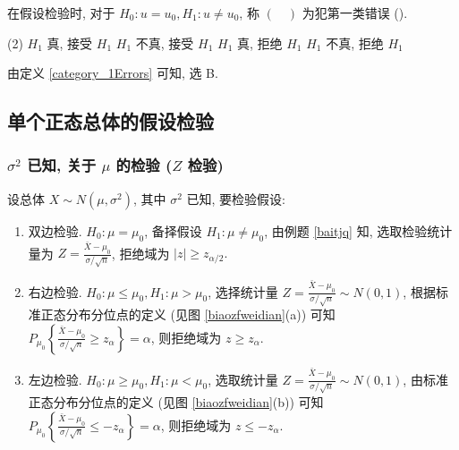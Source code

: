 \begin{example}
    在假设检验时, 对于 $H_0:u=u_0,H_1:u\neq u_0$, 称 $(\quad)$ 为犯第一类错误 (\quad).
    \begin{tasks}(2)
        \task $H_1$ 真, 接受 $H_1$
        \task $H_1$ 不真, 接受 $H_1$
        \task $H_1$ 真, 拒绝 $H_1$
        \task $H_1$ 不真, 拒绝 $H_1$
    \end{tasks}
\end{example}
\begin{solution}
    由定义 \ref{category_1Errors} 可知, 选 B.
\end{solution}

\subsection{单个正态总体的假设检验}

\subsubsection{\texorpdfstring{$\sigma^2$}. 已知, 关于 \texorpdfstring{$\mu$}. 的检验 (\texorpdfstring{$Z$}. 检验)}

设总体 $ X \sim N\left(\mu, \sigma^{2}\right)$, 其中 $ \sigma^{2} $ 已知, 要检验假设:
\begin{enumerate}[label=(\arabic{*})]
    \item 双边检验. $ H_{0}: \mu=\mu_{0} $, 备择假设 $ H_{1}: \mu \neq \mu_{0} $,
          由例题 \ref{baitjq} 知, 选取检验统计量为 $\displaystyle Z=\frac{\bar{X}-\mu_{0}}{\sigma / \sqrt{n}}$, 拒绝域为 $ |z| \geqslant z_{\alpha / 2} .$
    \item 右边检验. $ H_{0}: \mu \leqslant \mu_{0}, H_{1}: \mu>\mu_{0} $,
          选择统计量 $\displaystyle Z=\frac{\bar{X}-\mu_{0}}{\sigma / \sqrt{n}} \sim N(0,1) $, 根据标准正态分布分位点的定义 (见图 \ref{biaozfweidian}(a)) 可知 $\displaystyle P_{\mu_{0}}\left\{\frac{\bar{X}-\mu_{0}}{\sigma / \sqrt{n}} \geqslant z_{\alpha}\right\}=\alpha $, 则拒绝域为 $ z \geqslant z_{\alpha} .$
    \item 左边检验. $ H_{0}: \mu \geqslant \mu_{0}, H_{1}: \mu<\mu_{0} $,
          选取统计量 $\displaystyle  Z=\frac{\bar{X}-\mu_{0}}{\sigma / \sqrt{n}} \sim N(0,1)$, 由标准正态分布分位点的定义 (见图 \ref{biaozfweidian}(b)) 可知 $\displaystyle P_{\mu_{0}}\left\{\frac{\bar{X}-\mu_{0}}{\sigma / \sqrt{n}} \leqslant-z_{\alpha}\right\}=\alpha$, 则拒绝域为 $ z \leqslant-z_{\alpha} .$
\end{enumerate}

